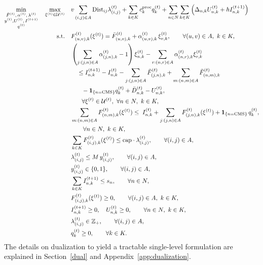 \documentclass{article}
\begin{document}
\begin{align}
\min_{\substack{\bar F^{(t)},\,\alpha^{(t)},\,\lambda^{(t)}\\y^{(t)}, 
U^{(t)},\,I^{(t+1)}\\q^{(t)}}}
\quad
\max_{\xi^{(t)}\in\mathcal U^{(t)}}
\quad &
v \sum_{(i,j)\in A} \mathrm{Dist}_{ij}\lambda_{(i,j)}^{(t)}
+
\sum_{k\in K} c_k^{\mathrm{proc}} q_k^{(t)}
+
\sum_{n\in N}\sum_{k\in K}
\left(
\Delta_{n,k}U_{n,k}^{(t)} + h I_{n,k}^{(t+1)}
\right)
\\
\text{s.t.}\quad
&
F_{(u,v),k}^{(t)}(\xi^{(t)})=
\bar F_{(u,v),k}^{(t)}
+
\alpha_{(u,v),k}^{(t)}\,\xi_{v,k}^{(t)},
\qquad \forall (u,v)\in A,\ k\in K,
\\
&
\left(
\sum_{j:(j,n)\in A} \alpha_{(j,n),k}^{(t)} - 1
\right)\xi_{n,k}^{(t)}
-
\sum_{r:(n,r)\in A} \alpha_{(n,r),k}^{(t)} \xi_{r,k}^{(t)}
\notag\\
&\quad\le
I_{n,k}^{(t+1)}
-
I_{n,k}^{(t)}
-
\sum_{j:(j,n)\in A} \bar F_{(j,n),k}^{(t)}
+
\sum_{m:(n,m)\in A} \bar F_{(n,m),k}^{(t)}
\notag\\
&\quad\phantom{\le}
-
\mathbf{1}_{\{n=\mathrm{CMS}\}} q_k^{(t)}
+
\bar D_{n,k}^{(t)}
-
U_{n,k}^{(t)},
\notag\\
&\quad\phantom{\le}
\forall \xi^{(t)}\in\mathcal{U}^{(t)},\ 
\forall n\in N,\ k\in K,
\\
&
\sum_{m:(n,m)\in A} F_{(n,m),k}^{(t)}(\xi^{(t)})
\le\;
I_{n,k}^{(t)}
+
\sum_{j:(j,n)\in A} F_{(j,n),k}^{(t)}(\xi^{(t)})
+
\mathbf{1}_{\{n=\mathrm{CMS}\}}\, q_k^{(t)},
\notag\\
&\qquad \forall n\in N,\ k\in K,
\\
&
\sum_{k\in K} F_{(i,j),k}^{(t)}(\xi^{(t)})
\le \mathrm{cap}\cdot \lambda_{(i,j)}^{(t)},
\qquad \forall (i,j)\in A,
\\
&
\lambda_{(i,j)}^{(t)} \le M\, y_{(i,j)}^{(t)},
\qquad \forall (i,j)\in A,
\\
&
y_{(i,j)}^{(t)} \in \{0,1\},
\qquad \forall (i,j)\in A,
\\
&
\sum_{k\in K} I_{n,k}^{(t+1)} \le s_n,
\qquad \forall n\in N,
\\
&
F_{(i,j),k}^{(t)}(\xi^{(t)}) \ge 0,
\qquad \forall (i,j)\in A,\ k\in K,
\\
&
I_{n,k}^{(t+1)} \ge 0,\quad U_{n,k}^{(t)} \ge 0,
\qquad \forall n\in N,\ k\in K,
\\
&
\lambda_{(i,j)}^{(t)} \in \mathbb{Z}_+,
\qquad \forall (i,j)\in A,
\\
&
q_k^{(t)} \ge 0,
\qquad \forall k\in K.
\end{align}
The details on dualization to yield a tractable single-level formulation are explained in Section~\ref{dual} and Appendix~\ref{app:dualization}.
\end{document}
